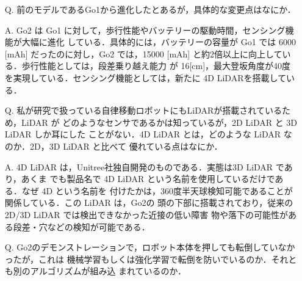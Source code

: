 \documentclass{jsarticle}
\begin{document}
\begin{itemize}
  \addtolength{\itemindent}{5.4zw}
  \item [Q.]前のモデルであるGo1から進化したとあるが，具体的な変更点はなにか．
  \vspace*{1zh}

  \item [A.]Go2 は Go1 に対して，歩行性能やバッテリーの駆動時間，センシング機能が大幅に進化
  \hspace*{5.5zw}している．具体的には，バッテリーの容量が Go1 では 6000 [mAh] だったのに対し，Go2
  \hspace*{5.5zw}では，15000 [mAh] と約2倍以上に向上している．歩行性能としては，段差乗り越え能力
  \hspace*{5.5zw}が 16[cm]，最大登坂角度が40度を実現している．センシング機能としては，新たに 4D 
  \hspace*{5.5zw}LiDARを搭載している．\\
  \vspace*{1zh}

  \item [Q.]私が研究で扱っている自律移動ロボットにもLiDARが搭載されているため，LiDAR が 
  \hspace*{5.5zw}どのようなセンサであるかは知っているが，2D LiDAR と 3D LiDAR しか耳にした
  \hspace*{5.5zw}ことがない．4D LiDAR とは，どのような LiDAR なのか．2D，3D LiDAR と比べて
  \hspace*{5.5zw}優れている点はなにか．
  \vspace*{1zh}

  \item [A.]4D LiDAR は，Unitree社独自開発のものである．実態は3D LiDAR であり，あくま
  \hspace*{5.5zw}でも製品名で 4D LiDAR という名前を使用しているだけである．なぜ 4D という名前を
  \hspace*{5.5zw}付けたかは，360度半天球検知可能であることが関係している．この LiDAR は，Go2の
  \hspace*{5.5zw}頭の下部に搭載されており，従来の2D/3D LiDAR では検出できなかった近接の低い障害
  \hspace*{5.5zw}物や落下の可能性がある段差・穴などの検知が可能である．\\
  \vspace*{1zh}

  \item [Q.]Go2のデモンストレーションで，ロボット本体を押しても転倒していなかったが，これは
  \hspace*{5.5zw}機械学習もしくは強化学習で転倒を防いでいるのか．それとも別のアルゴリズムが組み込
  \hspace*{5.5zw}まれているのか．
  \vspace*{1zh}


\end{itemize}
\end{document}
